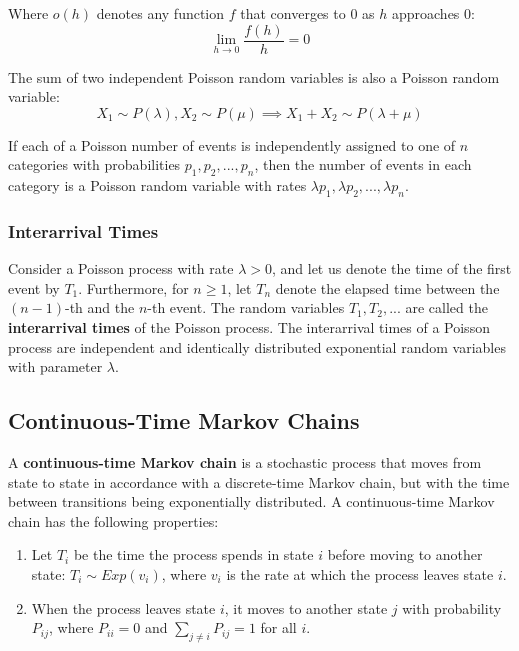 \documentclass[12pt]{article}
\begin{document}
\noindent
Where $o(h)$ denotes any function $f$ that converges to $0$ as $h$ approaches $0$:
\[ \lim_{h \rightarrow 0} \frac{f(h)}{h} = 0 \]

\noindent
The sum of two independent Poisson random variables is also a Poisson random variable:
\[ X_1 \sim P(\lambda), X_2 \sim P(\mu) \implies X_1 + X_2 \sim P(\lambda + \mu) \]

\noindent
If each of a Poisson number of events is independently assigned to one of $n$ categories with probabilities $p_1, p_2, ... , p_n$, then the number of events in each category is a Poisson random variable with rates $\lambda p_1, \lambda p_2, ... , \lambda p_n$.

\newpage
\subsubsection{Interarrival Times}
Consider a Poisson process with rate $\lambda > 0$, and let us denote the time of the first event by $T_1$.
Furthermore, for $n \geq 1$, let $T_n$ denote the elapsed time between the $(n - 1)$-th and the $n$-th event.
The random variables $T_1, T_2, ...$ are called the \textbf{interarrival times} of the Poisson process.
The interarrival times of a Poisson process are independent and identically distributed exponential random variables with parameter $\lambda$.

\subsection{Continuous-Time Markov Chains}
A \textbf{continuous-time Markov chain} is a stochastic process that moves from state to state in accordance with a discrete-time Markov chain, but with the time between transitions being exponentially distributed.
A continuous-time Markov chain has the following properties:

\begin{enumerate}
    \item Let $T_i$ be the time the process spends in state $i$ before moving to another state: $T_i \sim Exp(v_i)$, where $v_i$ is the rate at which the process leaves state $i$.
    \item When the process leaves state $i$, it moves to another state $j$ with probability $P_{ij}$, where $P_{ii} = 0$ and $\displaystyle \sum_{j \neq i} P_{ij} = 1$ for all $i$.
\end{enumerate}
\end{document}
